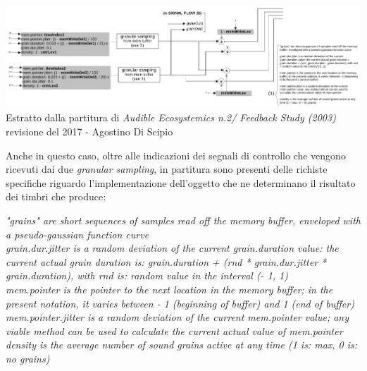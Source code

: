 \begin{center}
    \includegraphics[width=14cm]{figures/GRANULATORSFeedbackstudy2017.pdf} \\
    {Estratto dalla partitura di \textit{Audible Ecosystemics n.2/ Feedback Study (2003)} \\
    revisione del 2017 - Agostino Di Scipio} \\ 
    \vspace{0.5cm}
\end{center}

Anche in questo caso, oltre alle indicazioni dei segnali di controllo che vengono
ricevuti dai due \textit{granular sampling}, 
in partitura sono presenti delle richiste specifiche riguardo l'implementazione 
dell'oggetto che ne determinano il risultato dei timbri che produce: 

\begin{center}
    \vspace{0.5cm}
    \textit{"grains" are short sequences of samples read off the memory
    buffer, enveloped with a pseudo-gaussian function curve \\
    grain.dur.jitter is a random deviation of the current
    grain.duration value: the current actual grain duration is:
    grain.duration + (rnd * grain.dur.jitter * grain.duration), with rnd
    is: random value in the interval (- 1, 1) \\
    mem.pointer is the pointer to the next location in the memory
    buffer; in the present notation, it varies between - 1 (beginning
    of buffer) and 1 (end of buffer) \\
    mem.pointer.jitter is a random deviation of the current
    mem.pointer value; any viable method can be used to
    calculate the current actual value of mem.pointer \\
    density is the average number of sound grains active at any
    time (1 is: max, 0 is: no grains)}
    \vspace{0.5cm}
\end{center}

